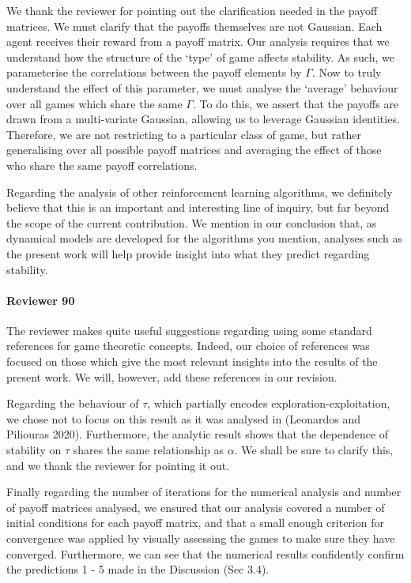\documentclass{article}
\begin{document}
We thank the reviewer for pointing out the clarification needed in the payoff matrices. We must clarify that the payoffs themselves are not
Gaussian. Each agent receives their reward from a payoff matrix. Our analysis requires that we understand how the structure of the `type' of game
affects stability. As such, we parameterise the correlations between the payoff elements by
$\Gamma$. Now to truly understand the effect of this parameter, we must analyse the `average'
behaviour over all games which share the same $\Gamma$. To do this, we assert that the payoffs are
drawn from a multi-variate Gaussian, allowing us to leverage Gaussian identities. Therefore, we are not restricting to a particular class of game, but rather
generalising over all possible payoff matrices and averaging the effect of those who share the same
payoff correlations.

Regarding the analysis of other reinforcement learning algorithms, we definitely believe that this
is an important and interesting line of inquiry, but far beyond the scope of the current contribution. We mention in our conclusion that, as
dynamical models are developed for the algorithms you mention, analyses such as the present work
will help provide insight into what they predict regarding stability.

\paragraph{Reviewer 90} %
\label{par:reviewer_90}

The reviewer makes quite useful suggestions regarding using some standard references for game
theoretic concepts. Indeed, our choice of references was focused on those which give the most
relevant insights into the results of the present work. We will, however, add these references in
our revision.

Regarding the behaviour of $\tau$, which partially encodes exploration-exploitation, we
chose not to focus on this result as it was analysed in (Leonardos and Piliouras 2020). Furthermore,
the analytic result shows that the dependence of stability on $\tau$ shares the same relationship as
$\alpha$. We shall be sure to clarify this, and we thank the reviewer for pointing it out.

Finally regarding the number of iterations for the numerical analysis and number of payoff matrices
analysed, we ensured that our analysis covered a number of initial conditions for each payoff
matrix, and that a small enough criterion for convergence was applied by visually assessing the
games to make sure they have converged. Furthermore, we can see that the numerical results
confidently confirm the predictions 1 - 5 made in the Discussion (Sec 3.4). 
\end{document}
